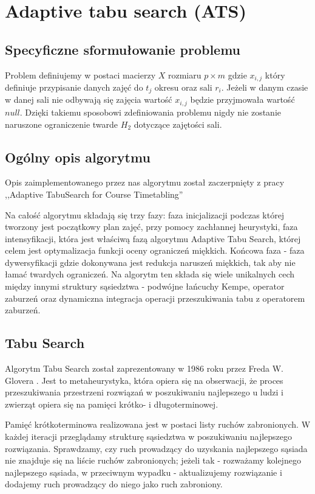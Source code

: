 \section{Adaptive tabu search (ATS)}
\author{Tomasz Dziopa, Katarzyna Śmietanka}
\subsection{Specyficzne sformułowanie problemu}
\par Problem definiujemy w postaci macierzy ${X}$  rozmiaru ${p \times m}$ gdzie ${x_{i,j}}$ który definiuje przypisanie danych zajęć do ${t_{j}}$ okresu oraz sali ${r_{i}}$. Jeżeli w danym czasie w danej sali nie odbywają się zajęcia wartość ${x_{i,j}}$ będzie przyjmowała wartość ${null}$. Dzięki takiemu sposobowi zdefiniowania problemu nigdy nie zostanie naruszone ograniczenie twarde ${H_{2}}$ dotyczące zajętości sali.
\subsection{Ogólny opis algorytmu}
\par Opis zaimplementowanego przez nas algorytmu został zaczerpnięty z pracy ,,Adaptive TabuSearch for Course Timetabling'' \cite{tabu}
\par Na całość algorytmu składają się trzy fazy: faza inicjalizacji podczas której tworzony jest początkowy plan zajęć, przy pomocy zachłannej heurystyki, faza intensyfikacji, która jest właściwą fazą algorytmu Adaptive Tabu Search, której celem jest optymalizacja funkcji oceny ograniczeń miękkich. Końcowa faza - faza dywersyfikacji gdzie dokonywana jest redukcja naruszeń miękkich, tak aby nie łamać twardych ograniczeń. Na algorytm ten składa się wiele unikalnych cech między innymi struktury sąsiedztwa - podwójne łańcuchy Kempe, operator zaburzeń oraz dynamiczna integracja operacji przeszukiwania tabu z operatorem zaburzeń.

\subsection{Tabu Search}
\par Algorytm Tabu Search został zaprezentowany w 1986 roku przez Freda W. Glovera \cite{glover}. Jest to metaheurystyka, która opiera się na obserwacji, że proces przeszukiwania przestrzeni rozwiązań w poszukiwaniu najlepszego u ludzi i zwierząt opiera się na pamięci krótko- i długoterminowej. 
\par Pamięć krótkoterminowa realizowana jest w postaci listy ruchów zabronionych. W każdej iteracji przeglądamy strukturę sąsiedztwa w poszukiwaniu najlepszego rozwiązania. Sprawdzamy, czy ruch prowadzący do uzyskania najlepszego sąsiada nie znajduje się na liście ruchów zabronionych; jeżeli tak - rozważamy kolejnego najlepszego sąsiada, w przeciwnym wypadku - aktualizujemy rozwiązanie i dodajemy ruch prowadzący do niego jako ruch zabroniony.

